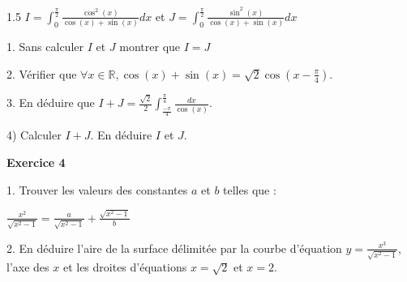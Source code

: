 \documentclass[12pt]{article}
\begin{document}
\begin{spacing}{1.5}
 $I = \int_{0}^{\frac{\pi}{2}}\frac{\cos^2(x)}{\cos(x) + \sin(x)}dx$ et $J = \int_{0}^{\frac{\pi}{2}}\frac{\sin^2(x)}{\cos(x) + \sin(x)}dx$ 

 1. Sans calculer $I$ et $J$ montrer que $I = J$
 
 2. Vérifier que $\forall {x\in \mathbb{R}}, \cos(x)+\sin(x) = \sqrt{2}\cos(x-\frac{\pi}{4})$.
 
 3. En déduire que $I+J = \frac{\sqrt{2}}{2}\int_{\frac{-\pi}{4}}^{\frac{\pi}{4}}\frac{dx}{\cos(x)}$.
 
 4) Calculer $I + J$. En déduire $I$ et $J$.
 
 \textbf{Exercice 4 }
 
  1. Trouver les valeurs des constantes $a$ et $b$ telles que :

$\frac{x^2}{\sqrt{x^2-1}}=\frac{a}{\sqrt{x^2-1}} + \frac{\sqrt{x^2-1}}{b}$

 2. En déduire l'aire de la surface délimitée par la courbe d'équation $y = \frac{x^3}{\sqrt{x^2-1}}$, l'axe des $x$ et les droites d'équations $x = \sqrt{2}$ et $x = 2$.
 
 
 \quad
 \quad

\end{spacing}
\end{document}
